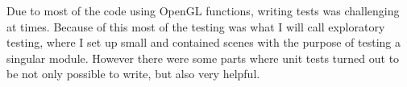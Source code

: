 

Due to most of the code using OpenGL functions,
writing tests was challenging at times.
Because of this most of the testing was what I will call exploratory testing,
where I set up small and contained scenes with the purpose of testing a singular module.
However there were some parts where unit tests turned out to be not only possible to write,
but also very helpful.
